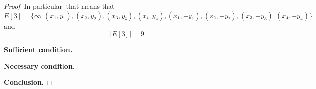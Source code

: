 \documentclass[12pt]{article}
\begin{document}
\begin{proof}
In particular, that means that
\begin{equation}
    E[3] = \{ \infty, (x_1, y_1), (x_2, y_2), (x_3, y_3), (x_4, y_4), (x_1, -y_1), (x_2, -y_2), (x_3, -y_3), (x_4, -y_4) \}
\end{equation}
and
\begin{equation}
    | E[3] | = 9
\end{equation}

\item{\textbf{Sufficient condition.}}


\item{\textbf{Necessary condition.}}


\item{\textbf{Conclusion.}}


\end{proof}
\end{document}
